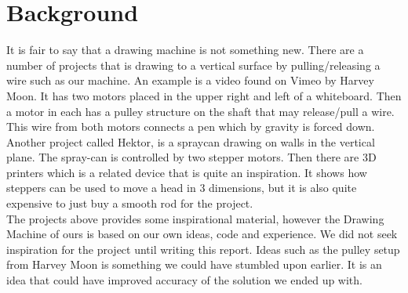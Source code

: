 
\section{Background}
It is fair to say that a drawing machine is not something new. There are a number of projects that is drawing to a vertical surface by pulling/releasing a wire such as our machine. An example is a video found on Vimeo\citep{Vimio:2010:DrawingMachine} by Harvey Moon. It has two motors placed in the upper right and left of a whiteboard. Then a motor in each has a pulley structure on the shaft that may release/pull a wire. This wire from both motors connects a pen which by gravity is forced down.\\ Another project called Hektor, is  a spraycan drawing on walls in the vertical plane. The spray-can is controlled by two stepper motors\citep{Lehni:2002:Hektor}. Then there are 3D printers which is a related device that is quite an inspiration. It shows how steppers can be used to move a head in 3 dimensions, but it is also quite expensive to just buy a smooth rod for the project.\\

The projects above provides some inspirational material, however the Drawing Machine of ours is based on our own ideas, code and experience.  We did not seek inspiration for the project until writing this report. Ideas such as the pulley setup from Harvey Moon is something we could have stumbled upon earlier. It is an idea that could have improved accuracy of the solution we ended up with. 